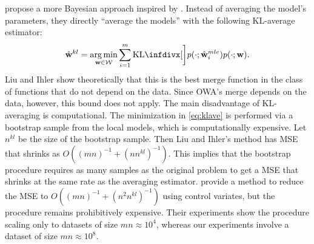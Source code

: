 \documentclass[thesis.tex]{subfiles}
\begin{document}
\citet{liu2014distributed} propose a more Bayesian approach inspired by \citet{merugu2003privacy}.
Instead of averaging the model's parameters,
they directly ``average the models'' with the following KL-average estimator:
\begin{equation}
    \label{eq:klave}
\wkl = \argmin_{\w\in\W} \sum_{i=1}^m \kl[\bigg]{p(\cdot;\wmle_i)}{p(\cdot;\w)}
.
\end{equation}
Liu and Ihler show theoretically that this is the best merge function in the class of functions that do not depend on the data.
Since OWA's merge depends on the data, however, this bound does not apply.
The main disadvantage of KL-averaging is computational.
The minimization in \eqref{eq:klave} is performed via a bootstrap sample from the local models,
which is computationally expensive.
Let $n^{kl}$ be the size of the bootstrap sample.
Then Liu and Ihler's method has MSE that shrinks as $O((mn)^{-1}+(nn^{kl})^{-1})$.
This implies that the bootstrap procedure requires as many samples as the original problem to get a MSE that shrinks at the same rate as the averaging estimator.
\citet{han2016bootstrap} provide a method to reduce the MSE to $O((mn)^{-1}+(n^2n^{kl})^{-1})$ using control variates, but the procedure remains prohibitively expensive.
Their experiments show the procedure scaling only to datasets of size $mn\approx10^4$,
whereas our experiments involve a dataset of size $mn\approx10^8$.

\end{document}
